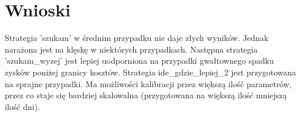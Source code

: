\documentclass{article}
\begin{document}
\section{Wnioski}
Strategia 'szukam' w średnim przypadku nie daje złych wyników. Jednak narażona jest na klęskę w niektórych przypadkach. 
Następna strategia 'szukam\_wyzej' jest lepiej uodporniona na przypadki gwałtownego spadku zysków poniżej granicy kosztów.
Strategia ide\_gdzie\_lepiej\_2 jest przygotowana na sprajne przypadki. Ma możliwości kalibracji przez większą ilość parametrów, 
przez co staje się bardziej skalowalna (przygotowana na większą ilość\/ mniejszą ilość dni). 
\end{document}
